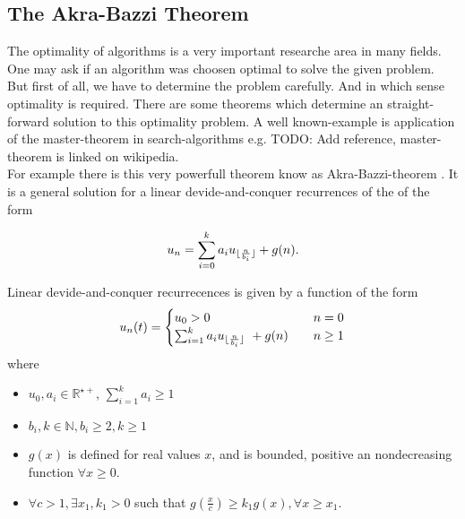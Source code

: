 \subsection{The Akra-Bazzi Theorem}
\label{subsection:The Akra-Bazzi Theorem}
The optimality of algorithms is a very important researche area in many fields.
One may ask if an algorithm was choosen optimal to solve the given problem.
But first of all, we have to determine the problem carefully. And in which sense optimality is required. There are some theorems which determine an straight-forward solution to this optimality problem. A well known-example is application of the master-theorem in search-algorithms e.g. \cite {}TODO: Add reference, master-theorem is linked on wikipedia.\\
For example there is this very powerfull theorem know as Akra-Bazzi-theorem \cite{AB98}.
It is a general solution for a linear devide-and-conquer recurrences of the of the form

 \begin{equation}
 \label{eq:linearDevideAndConquerRecurrence}
 u_n = \sum_{i=0}^k a_i u _{\lfloor\frac{n}{b_i}\rfloor} + g(n).
 \end{equation}
 
 Linear devide-and-conquer recurrecences is given by a function of the form\begin{equation}
 u_n(t) = 
 	\begin{cases}
			u_0 > 0 & n= 0 \\
			\sum_{i=1}^k a_i u_{\lfloor\frac{n}{b_i}\rfloor} \ + g(n) \quad &n  \geq 1 
	\end{cases}
 \end{equation}
 where
 \begin{itemize}
 \item $u_0, a_i \in \mathbb{R}^{\star+}$, $\sum_{i=1}^k a_i \geq 1$
 \item $b_{i}, k \in \mathbb{N}, b_i \geq 2, k\geq 1$
 \item $g(x)$ is defined for real values $x$, and is bounded, positive an nondecreasing function $\forall x\geq 0$.
 \item $\forall c > 1, \exists x_1, k_1 >0$ such that $g(\frac{x}{c}) \geq k_1 g(x), \forall x \geq x_1$. 
 \end{itemize}
 
